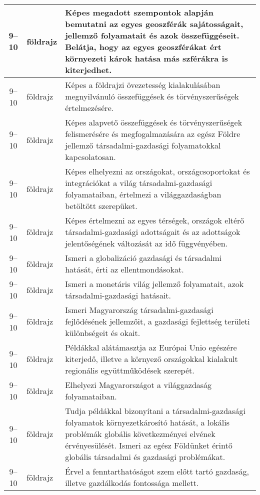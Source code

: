 \begin{small}
\begin{longtable}{c | p{2cm} |  p{11cm} }
              9--10 & földrajz & Képes megadott szempontok alapján bemutatni az egyes geoszférák sajátosságait, jellemző folyamatait és azok összefüggéseit. Belátja, hogy az egyes geoszférákat ért környezeti károk hatása más szférákra is kiterjedhet. \\ \hline
              9--10 & földrajz & Képes a földrajzi övezetesség kialakulásában megnyilvánuló összefüggések és törvényszerűségek értelmezésére. \\ \hline
              9--10 & földrajz & Képes alapvető összefüggések és törvényszerűségek felismerésére és megfogalmazására az egész Földre jellemző társadalmi-gazdasági folyamatokkal kapcsolatosan. \\ \hline
              9--10 & földrajz & Képes elhelyezni az országokat, országcsoportokat és integrációkat a világ társadalmi-gazdasági folyamataiban, értelmezi a világgazdaságban betöltött szerepüket. \\ \hline
              9--10 & földrajz & Képes értelmezni az egyes térségek, országok eltérő társadalmi-gazdasági adottságait és az adottságok jelentőségének változását az idő függvényében. \\ \hline
              9--10 & földrajz & Ismeri a globalizáció gazdasági és társadalmi hatását, érti az ellentmondásokat. \\ \hline
              9--10 & földrajz & Ismeri a monetáris világ jellemző folyamatait, azok társadalmi-gazdasági hatásait. \\ \hline
              9--10 & földrajz & Ismeri Magyarország társadalmi-gazdasági fejlődésének jellemzőit, a gazdasági fejlettség területi különbségeit és okait. \\ \hline
              9--10 & földrajz & Példákkal alátámasztja az Európai Unio egészére kiterjedő, illetve a környező országokkal kialakult regionális együttműködések szerepét. \\ \hline
              9--10 & földrajz & Elhelyezi Magyarországot a világgazdaság folyamataiban. \\ \hline
              9--10 & földrajz & Tudja példákkal bizonyítani a társadalmi-gazdasági folyamatok környezetkárosító hatását, a lokális problémák globális következményei elvének érvényesülését. Ismeri az egész Földünket érintő globális társadalmi és gazdasági problémákat. \\ \hline
              9--10 & földrajz & Érvel a fenntarthatóságot szem előtt tartó gazdaság, illetve gazdálkodás fontossága mellett. \\ \hline

\end{longtable}
\end{small}

